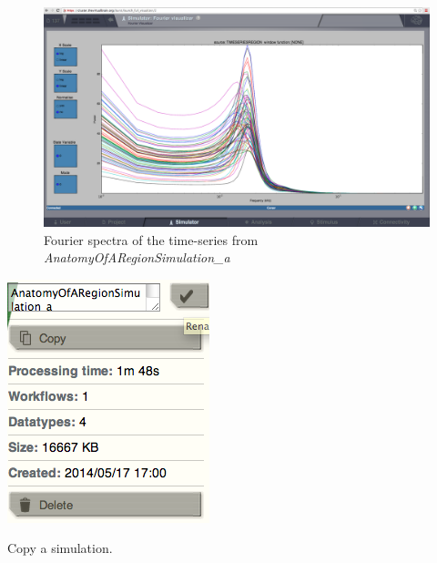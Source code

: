 \documentclass{tufte-handout}
\begin{document}
\begin{figure}[h]
  \includegraphics[width=\linewidth]{Handout_UI_BuildingYourOwnBrainNetworkModel_Fourier}%
  \caption{Fourier spectra of the time-series from \textit{AnatomyOfARegionSimulation\_a}}%
  \label{fig:fourier}%
\end{figure}


\begin{marginfigure}
  \includegraphics[width=\linewidth]{Handout_UI_BuildingYourOwnBrainNetworkModel_CopyASimulation}
  \caption{Copy a simulation.}%
  \label{fig:sim_copy}%
\end{marginfigure}
\end{document}
